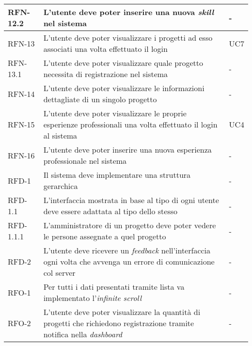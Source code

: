\begin{table}
\begin{tabularx}{\textwidth}{lXl}
RFN-12.2 & L'utente deve poter inserire una nuova \emph{skill} nel sistema & - \\
\hline
RFN-13 & L'utente deve poter visualizzare i progetti ad esso associati una volta effettuato il login & UC7 \\
\hline
RFN-13.1 & L'utente deve poter visualizzare quale progetto necessita di registrazione nel sistema & - \\
\hline
RFN-14 & L'utente deve poter visualizzare le informazioni dettagliate di un singolo progetto & - \\
\hline
RFN-15 & L'utente deve poter visualizzare le proprie esperienze professionali una volta effettuato il login al sistema & UC4 \\
\hline
RFN-16 & L'utente deve poter inserire una nuova esperienza professionale nel sistema & - \\
\hline
RFD-1 & Il sistema deve implementare una struttura gerarchica & - \\
\hline
RFD-1.1 & L'interfaccia mostrata in base al tipo di ogni utente deve essere adattata al tipo dello stesso & - \\
\hline
RFD-1.1.1 & L'amministratore di un progetto deve poter vedere le persone assegnate a quel progetto & - \\
\hline
RFD-2 & L'utente deve ricevere un \emph{feedback} nell'interfaccia ogni volta che avvenga un errore di comunicazione col server & - \\
\hline
RFO-1 & Per tutti i dati presentati tramite lista va implementato l'\emph{infinite scroll} & - \\
\hline
RFO-2 & L'utente deve poter visualizzare la quantità di progetti che richiedono registrazione tramite notifica nella \emph{dashboard} & - \\
\hline
\end{tabularx}
\end{table}%

